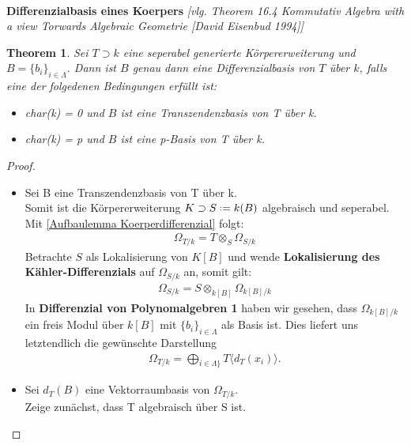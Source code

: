 \documentclass[10pt,a4paper]{report}
\newcommand{\comment}[1]{}
\newcommand{\ModulsOfDifferenzials}{Kommutativ Algebra with a view Torwards Algebraic Geometrie [David Eisenbud 1994]}
\newcounter{Aussage}[chapter]
\newtheorem{theorem}[Aussage]{Theorem}
\newcommand{\divR}[2]{\Omega_{#1/#2}}
\newcommand{\divf}[1]{d_{#1}}
\newcommand{\Tensor}[3]{#1 \otimes_{#2} #3}
\newcommand*{\defeq}{\mathrel{\vcenter{\baselineskip0.5ex \lineskiplimit0pt
                     \hbox{\scriptsize.}\hbox{\scriptsize.}}}%
                     =}
\begin{document}
\ \\
\textbf{Differenzialbasis eines Koerpers} \textit{[vlg. Theorem 16.4 \ModulsOfDifferenzials]}
\begin{theorem}\comment{\label{Differenzialbasis eines Koerpers}}
Sei $T \supset k$ eine seperabel generierte Körpererweiterung und $B = \lbrace b_i \rbrace_{i \in \Lambda}$. Dann ist $B$ genau dann eine Differenzialbasis von $T$ über $k$, falls eine der folgedenen Bedingungen erfüllt ist:
\begin{itemize}
\item[\textbf{1.}] char(k) = 0 und $B$ ist eine Transzendenzbasis von T über k.
\item[\textit{2.}] char(k) = p und $B$ ist eine p-Basis von T über k.
\end{itemize}
\end{theorem}
\begin{proof}
\ \\
\begin{itemize}
\item[\underline{\textbf{1.}"$\Leftarrow$":}] Sei B eine Transzendenzbasis von T über k.\\
Somit ist die Körpererweiterung $K \supset S \defeq k(B)$ algebraisch und seperabel. Mit \cref{Aufbaulemma Koerperdifferenzial} folgt:
\begin{gather*}
\divR{T}{k} = \Tensor{T}{S}{\divR{S}{k}}
\end{gather*}
Betrachte $S$ als Lokalisierung von $K[B]$ und wende \textbf{Lokalisierung des Kähler-Differenzials} \comment{\cref{Lokalisierung des Kähler-Differenzials}} auf $\divR{S}{k}$ an, somit gilt:
\begin{gather*}
\divR{S}{k} = \Tensor{S}{k[B]}{\divR{k[B]}{k}}
\end{gather*}
In \textbf{Differenzial von Polynomalgebren 1} \comment{\label{dies brauche ich allerdings für unendliche Mengen Lambda}\cref{Differenzial von Polynomalgebren 1}} haben wir gesehen, dass $\divR{k[B]}{k}$ ein freis Modul über $k[B]$ mit $\lbrace b_i \rbrace_{i \in \Lambda}$ als Basis ist. Dies liefert uns letztendlich die gewünschte Darstellung
\begin{gather*}
\divR{T}{k} = \bigoplus_{i \in \Lambda \rbrace} T \langle \divf{T}(x_i) \rangle .
\end{gather*}
\item[\underline{\textbf{1.}"$\Rightarrow$":}]Sei $\divf{T}(B)$ eine Vektorraumbasis von $\divR{T}{k}$.\\
Zeige zunächst, dass T algebraisch über S ist.\\

\end{itemize}
\end{proof}
\end{document}
